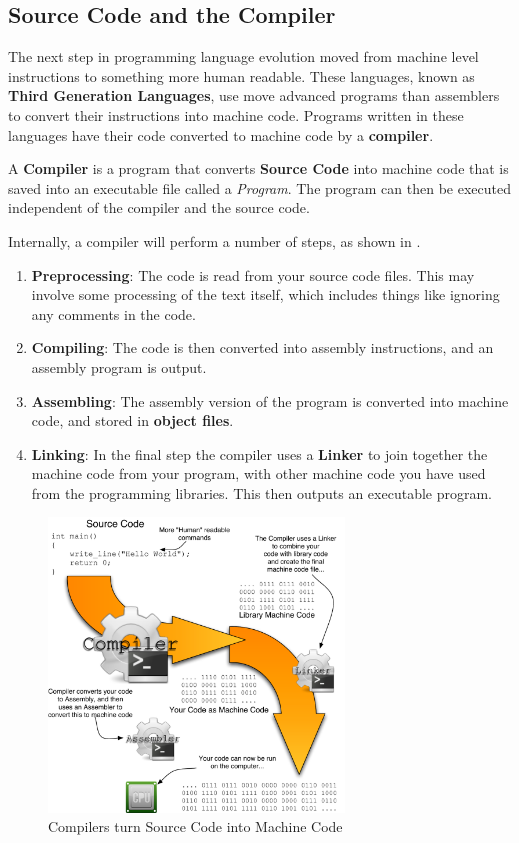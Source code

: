 \clearpage
\subsection{Source Code and the Compiler} %
\label{sub:source_code_and_the_compiler}

The next step in programming language evolution moved from machine level instructions to something more human readable. These languages, known as \textbf{Third Generation Languages}, use move advanced programs than assemblers to convert their instructions into machine code. Programs written in these languages have their code converted to machine code by a \textbf{compiler}.

A \textbf{Compiler} is a program that converts \textbf{Source Code} into machine code that is saved into an executable file called a \emph{Program}. The program can then be executed independent of the compiler and the source code.

Internally, a compiler will perform a number of steps, as shown in .

\begin{enumerate}
  \item \textbf{Preprocessing}: The code is read from your source code files. This may involve some processing of the text itself, which includes things like ignoring any comments in the code.
  \item \textbf{Compiling}: The code is then converted into assembly instructions, and an assembly program is output.
  \item \textbf{Assembling}: The assembly version of the program is converted into machine code, and stored in \textbf{object files}.
  \item \textbf{Linking}: In the final step the compiler uses a \textbf{Linker} to join together the machine code from your program, with other machine code you have used from the programming libraries. This then outputs an executable program.
\end{enumerate}

\begin{figure}[h]
   \centering
   \includegraphics[width=0.7\textwidth]{./topics/programs-and-compilers/diagrams/Compiler} 
   \caption{Compilers turn Source Code into Machine Code}
   \label{fig:compiler}
\end{figure}

